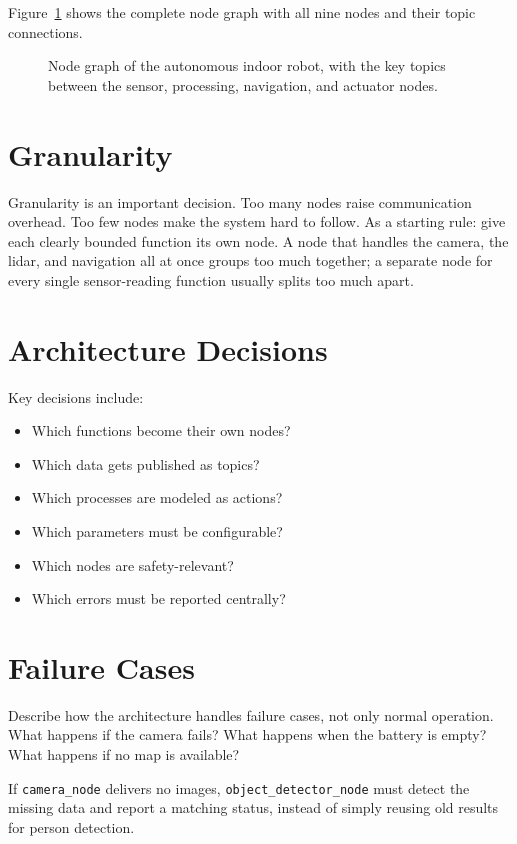 Figure~\ref{fig:kap15-node-graph} shows the complete node graph with all nine nodes and their topic connections.

\begin{figure}[H]
  \centering
  \caption{Node graph of the autonomous indoor robot, with the key topics between the sensor, processing, navigation, and actuator nodes.}
  \label{fig:kap15-node-graph}
\end{figure}

\section{Granularity}
Granularity is an important decision. Too many nodes raise communication overhead. Too few nodes make the system hard to follow. As a starting rule: give each clearly bounded function its own node. A node that handles the camera, the lidar, and navigation all at once groups too much together; a separate node for every single sensor-reading function usually splits too much apart.

\section{Architecture Decisions}
Key decisions include:

\begin{itemize}
    \item Which functions become their own nodes?
    \item Which data gets published as topics?
    \item Which processes are modeled as actions?
    \item Which parameters must be configurable?
    \item Which nodes are safety-relevant?
    \item Which errors must be reported centrally?
\end{itemize}

\section{Failure Cases}
Describe how the architecture handles failure cases, not only normal operation. What happens if the camera fails? What happens when the battery is empty? What happens if no map is available?

\begin{praxisbox}
If \texttt{camera\_node} delivers no images, \texttt{object\_detector\_node} must detect the missing data and report a matching status, instead of simply reusing old results for person detection.
\end{praxisbox}

